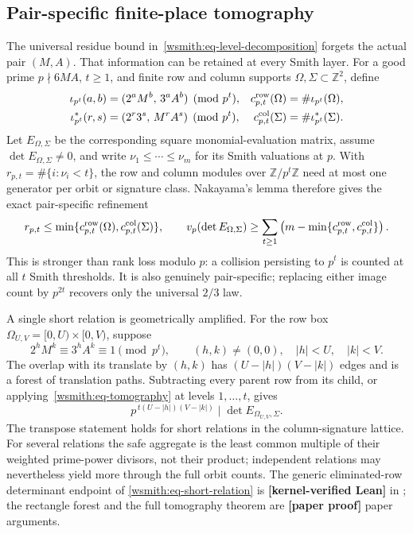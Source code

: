 \documentclass[11pt,oneside]{article}
\theoremstyle{definition}
\theoremstyle{remark}
\newcommand{\Z}{\mathbb Z}
\newcommand{\lean}[1]{\texttt{\detokenize{#1}}}
\newcommand{\statuslean}{\textcolor{leanblue}{\textbf{[kernel-verified Lean]}}}
\newcommand{\statusnew}{\textcolor{newgreen}{\textbf{[paper proof]}}}
\begin{document}
\subsection{Pair-specific finite-place tomography}
\label{wsmith:tomography}

The universal residue bound in~\eqref{wsmith:eq-level-decomposition} forgets the actual
pair $(M,A)$.  That information can be retained at every Smith layer.  For a good prime
$p\nmid6MA$, $t\ge1$, and finite row and column supports
$\Omega,\Sigma\subset\Z^2$, define
\begin{align}
 \iota_{p^t}(a,b)&=(2^aM^b,\,3^aA^b)\pmod{p^t},&
 c^{\rm row}_{p,t}(\Omega)&=\#\iota_{p^t}(\Omega),\notag\\
 \iota^*_{p^t}(r,s)&=(2^r3^s,\,M^rA^s)\pmod{p^t},&
 c^{\rm col}_{p,t}(\Sigma)&=\#\iota^*_{p^t}(\Sigma).
 \label{wsmith:eq-orbit-maps}
\end{align}
Let $E_{\Omega,\Sigma}$ be the corresponding square monomial-evaluation matrix, assume
$\det E_{\Omega,\Sigma}\ne0$, and write $\nu_1\le\cdots\le\nu_m$ for its Smith
valuations at $p$.  With
$r_{p,t}=\#\{i:\nu_i<t\}$, the row and column modules over $\Z/p^t\Z$ need at most one
generator per orbit or signature class.  Nakayama's lemma therefore gives the exact
pair-specific refinement
\begin{equation}
 r_{p,t}\le
 \min\{c^{\rm row}_{p,t}(\Omega),c^{\rm col}_{p,t}(\Sigma)\},
 \qquad
 v_p(\det E_{\Omega,\Sigma})
 \ge\sum_{t\ge1}
 \left(m-\min\{c^{\rm row}_{p,t},c^{\rm col}_{p,t}\}\right).
 \label{wsmith:eq-tomography}
\end{equation}
This is stronger than rank loss modulo $p$: a collision persisting to $p^t$ is counted at
all $t$ Smith thresholds.  It is also genuinely pair-specific; replacing either image
count by $p^{2t}$ recovers only the universal $2/3$ law.

A single short relation is geometrically amplified.  For the row box
$\Omega_{U,V}=[0,U)\times[0,V)$, suppose
\[
 2^hM^k\equiv3^hA^k\equiv1\pmod{p^t},
 \qquad (h,k)\ne(0,0),\quad |h|<U,\quad |k|<V.
\]
The overlap with its translate by $(h,k)$ has
$(U-|h|)(V-|k|)$ edges and is a forest of translation paths.  Subtracting every parent row
from its child, or applying~\eqref{wsmith:eq-tomography} at levels $1,\ldots,t$, gives
\begin{equation}
 p^{\,t(U-|h|)(V-|k|)}\mid\det E_{\Omega_{U,V},\Sigma}.
 \label{wsmith:eq-short-relation}
\end{equation}
The transpose statement holds for short relations in the column-signature lattice.  For
several relations the safe aggregate is the least common multiple of their weighted
prime-power divisors, not their product; independent relations may nevertheless yield more
through the full orbit counts.  The generic eliminated-row determinant endpoint of
\eqref{wsmith:eq-short-relation} is \statuslean{} in
\lean{FinitePlaceShortRelationCore}; the rectangle forest and the full tomography theorem
are \statusnew{} paper arguments.
\end{document}
